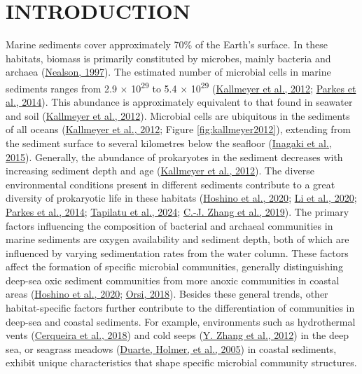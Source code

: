 \documentclass[
  12 pt,
]{book}
\makeatletter
\newcounter{savedfrontmatterpage}
\renewcommand{\mainmatter}{
    \cleardoublepage
    \setcounter{savedfrontmatterpage}{\value{page}}
    \@mainmattertrue
    \pagenumbering{arabic}
}
\makeatother
\begin{document}
\mainmatter

\pagestyle{mainbackmatter}

\hypertarget{introduction}{%
\chapter{INTRODUCTION}\label{introduction}}

Marine sediments cover approximately 70\si{\percent} of the Earth's surface. In these habitats, biomass is primarily constituted by microbes, mainly bacteria and archaea (\protect\hyperlink{ref-Nealson1997}{Nealson, 1997}). The estimated number of microbial cells in marine sediments ranges from 2.9 × 10\textsuperscript{29} to 5.4 × 10\textsuperscript{29} (\protect\hyperlink{ref-Kallmeyer2012}{Kallmeyer et al., 2012}; \protect\hyperlink{ref-Parkes2014}{Parkes et al., 2014}). This abundance is approximately equivalent to that found in seawater and soil (\protect\hyperlink{ref-Kallmeyer2012}{Kallmeyer et al., 2012}). Microbial cells are ubiquitous in the sediments of all oceans (\protect\hyperlink{ref-Kallmeyer2012}{Kallmeyer et al., 2012}; Figure \ref{fig:kallmeyer2012}), extending from the sediment surface to several kilometres below the seafloor (\protect\hyperlink{ref-Inagaki2015}{Inagaki et al., 2015}). Generally, the abundance of prokaryotes in the sediment decreases with increasing sediment depth and age (\protect\hyperlink{ref-Kallmeyer2012}{Kallmeyer et al., 2012}). The diverse environmental conditions present in different sediments contribute to a great diversity of prokaryotic life in these habitats (\protect\hyperlink{ref-Hoshino2020}{Hoshino et al., 2020}; \protect\hyperlink{ref-Li2020a}{Li et al., 2020}; \protect\hyperlink{ref-Parkes2014}{Parkes et al., 2014}; \protect\hyperlink{ref-Tapilatu2024}{Tapilatu et al., 2024}; \protect\hyperlink{ref-Zhang2019}{C.-J. Zhang et al., 2019}). The primary factors influencing the composition of bacterial and archaeal communities in marine sediments are oxygen availability and sediment depth, both of which are influenced by varying sedimentation rates from the water column. These factors affect the formation of specific microbial communities, generally distinguishing deep-sea oxic sediment communities from more anoxic communities in coastal areas (\protect\hyperlink{ref-Hoshino2020}{Hoshino et al., 2020}; \protect\hyperlink{ref-Orsi2018}{Orsi, 2018}). Besides these general trends, other habitat-specific factors further contribute to the differentiation of communities in deep-sea and coastal sediments. For example, environments such as hydrothermal vents (\protect\hyperlink{ref-Cerqueira2018}{Cerqueira et al., 2018}) and cold seeps (\protect\hyperlink{ref-Zhang2012a}{Y. Zhang et al., 2012}) in the deep sea, or seagrass meadows (\protect\hyperlink{ref-Duarte2005}{Duarte, Holmer, et al., 2005}) in coastal sediments, exhibit unique characteristics that shape specific microbial community structures.
\end{document}
